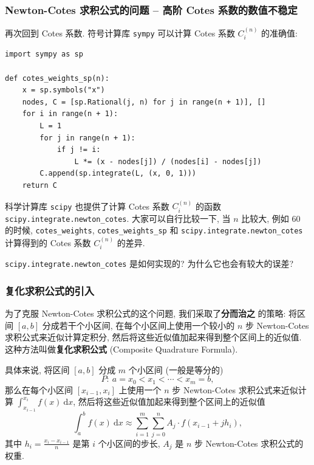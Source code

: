 \begin{frame}[fragile]
\frametitle{Newton-Cotes 求积公式的问题 -- 高阶 Cotes 系数的数值不稳定}

再次回到 Cotes 系数. 符号计算库 \verb|sympy| 可以计算 Cotes 系数 $C_i^{(n)}$ 的准确值:
\begin{lstlisting}
import sympy as sp

def cotes_weights_sp(n):
    x = sp.symbols("x")
    nodes, C = [sp.Rational(j, n) for j in range(n + 1)], []
    for i in range(n + 1):
        L = 1
        for j in range(n + 1):
            if j != i:
                L *= (x - nodes[j]) / (nodes[i] - nodes[j])
        C.append(sp.integrate(L, (x, 0, 1)))
    return C
\end{lstlisting}

科学计算库 \verb|scipy| 也提供了计算 Cotes 系数 $C_i^{(n)}$ 的函数 \verb|scipy.integrate.newton_cotes|.
大家可以自行比较一下, 当 $n$ 比较大, 例如 $60$ 的时候, \verb|cotes_weights|, \verb|cotes_weights_sp| 和 \verb|scipy.integrate.newton_cotes| 计算得到的 Cotes 系数 $C_i^{(n)}$ 的差异.

\begin{question}
\verb|scipy.integrate.newton_cotes| 是如何实现的? 为什么它也会有较大的误差?
\end{question}

\end{frame}


\begin{frame}
\frametitle{复化求积公式的引入}

为了克服 Newton-Cotes 求积公式的这个问题, 我们采取了\textbf{分而治之} 的策略: 将区间 $[a, b]$ 分成若干个小区间, 在每个小区间上使用一个较小的 $n$ 步 Newton-Cotes 求积公式来近似计算定积分, 然后将这些近似值加起来得到整个区间上的近似值. 这种方法叫做\textbf{复化求积公式} (Composite Quadrature Formula).

\pause
\vspace{0.5em}

具体来说, 将区间 $[a, b]$ 分成 $m$ 个小区间 (一般是等分的)
\[
P: ~ a = x_0 < x_1 < \cdots < x_m = b,
\]
那么在每个小区间 $[x_{i-1}, x_i]$ 上使用一个 $n$ 步 Newton-Cotes 求积公式来近似计算 $\int_{x_{i-1}}^{x_i} f(x) ~ \mathrm{d}x$, 然后将这些近似值加起来得到整个区间上的近似值
\[
\int_a^b f(x) ~ \mathrm{d}x \approx \sum_{i=1}^m  \sum_{j=0}^n A_j \cdot f(x_{i-1} + j h_i),
\]
其中 $h_i = \frac{x_i - x_{i-1}}{n}$ 是第 $i$ 个小区间的步长, $A_j$ 是 $n$ 步 Newton-Cotes 求积公式的权重.

\end{frame}

